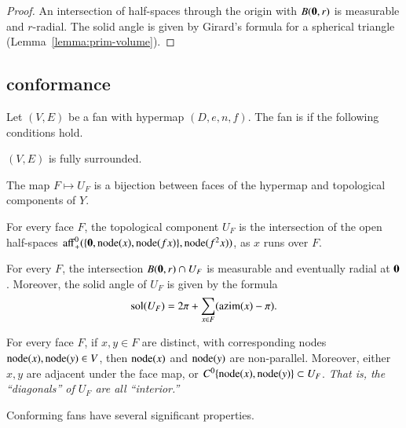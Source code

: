 \begin{proof} An intersection of half-spaces through the origin 
with $B({\mathbf 0},r)$ is measurable and
$r$-radial.  The solid angle is given by Girard's formula for
a spherical triangle (Lemma~\ref{lemma:prim-volume}).
\end{proof}
%

\subsection{conformance}


\begin{definition}
Let $(V,E)$ be a fan with hypermap $(D,e,n,f)$.  The fan is
 if the following conditions hold.
\begin{nomerate}
\item {} $(V,E)$ is fully surrounded.
\item {} The map $F\mapsto U_F$ is a bijection between
faces of the hypermap and topological components of $Y$.
\item {} For every face $F$, the topological component
$U_F$ is the intersection of the open half-spaces
${\operatorname{aff}}_+^0(\{{\mathbf 0},{\operatorname{node}}(x),{\operatorname{node}}({f x})\},{\operatorname{node}}(f^2 x))$, as $x$ runs over
$F$.
\item {} For every $F$, the intersection
$B({\mathbf 0},r)\cap U_F$ is measurable and eventually radial at ${\mathbf 0}$.
Moreover, the solid angle of $U_F$ is given by the formula
\begin{displaymath}
\operatorname{sol}(U_F) = 2\pi + \sum_{x\in F}({\operatorname{azim}}(x)-\pi).
\end{displaymath}
\item {} For every face $F$, if $x,y\in F$ are distinct,
with corresponding nodes ${\operatorname{node}}(x),{\operatorname{node}}(y)\in V$, then ${\operatorname{node}}(x)$ and
${\operatorname{node}}(y)$ are non-parallel.  Moreover, either $x,y$ are adjacent under
the face map, or $C^0\{{\operatorname{node}}(x),{\operatorname{node}}(y)\}\subset U_F$.  {\it That is, the
``diagonals'' of $U_F$ are all ``interior.''}
\end{nomerate}
\end{definition}


Conforming fans have several significant properties. 

